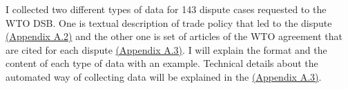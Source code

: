 I collected two different types of data for 143 dispute cases 
requested to the WTO DSB.
One is textual description of trade policy 
that led to the dispute \hyperref[sub:factual-aspect-example]{(Appendix A.2)} and the other one is 
set of articles of the WTO agreement that are
cited for each dispute \hyperref[sub:cited-articles-table]{(Appendix A.3)}. 
I will explain the format and the content of 
each type of data with an example. 
Technical details about the automated way 
of collecting data will be
explained in the \hyperref[sub:cited-articles-table]{(Appendix A.3)}.










  
    
  
